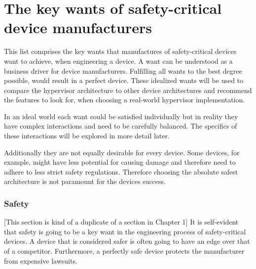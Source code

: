 
\chapter{The key wants of safety-critical device manufacturers} %

\label{Chapter3} %


\newcommand{\keyword}[1]{\textbf{#1}}
\newcommand{\tabhead}[1]{\textbf{#1}}
\newcommand{\code}[1]{\texttt{#1}}
\newcommand{\file}[1]{\texttt{\bfseries#1}}
\newcommand{\option}[1]{\texttt{\itshape#1}}


This list comprises the key wants that manufactures of safety-critical devices want to achieve, when engineering a device. A want can be understood as a business driver for device manufacturers. Fulfilling all wants to the best degree possible, would result in a perfect device. These idealized wants will be used to compare the hypervisor architecture to other device architectures and recommend the features to look for, when choosing a real-world hypervisor implementation.

In an ideal world each want could be satisfied individually but in reality they have complex interactions and need to be carefully balanced. The specifics of these interactions will be explored in more detail later.

Additionally they are not equally desirable for every device. Some devices, for example, might have less potential for causing damage and therefore need to adhere to less strict safety regulations. Therefore choosing the absolute safest architecture is not paramount for the devices success.

\subsection{Safety}
[This section is kind of a duplicate of a section in Chapter 1]
It is self-evident that safety is going to be a key want in the engineering process of safety-critical devices. A device that is considered safer is often going to have an edge over that of a competitor. Furthermore, a perfectly safe device protects the manufacturer from expensive lawsuits.

